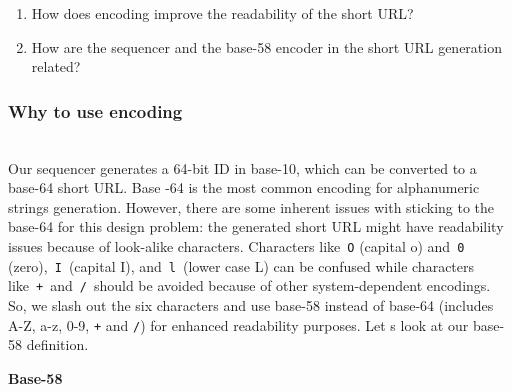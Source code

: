 \begin{enumerate}
\item
\protect{}\label{rLDVaqn8NgodqRd_ozNdy}
How does encoding improve the readability of the short URL?
\item
\protect{}\label{7qYu3UbIk-ill2JuMAZ_V}
How are the sequencer and the base-58 encoder in the short URL generation related?
\end{enumerate}

\subsubsection{Why to use encoding}\label{mgWiNHUUh24oxXd4R2PW_}
\\
Our sequencer generates a 64-bit ID in base-10, which can be converted to a base-64 short URL. Base -64 is the most common encoding for alphanumeric strings\textquotesingle{} generation. However, there are some inherent issues with sticking to the base-64 for this design problem: the generated short URL might have readability issues because of look-alike characters. Characters like~\texttt{O} (capital o) and~\texttt{0} (zero),~\texttt{I}~(capital I), and~\texttt{l}~(lower case L) can be confused while characters like~\texttt{+}~and~\texttt{/}~should be avoided because of other system-dependent encodings.
\\
So, we slash out the six characters and use base-58 instead of base-64 (includes A-Z, a-z, 0-9, \texttt{+} and \texttt{/}) for enhanced readability purposes. Let
\textquotesingle s look at our base-58 definition.

\textbf{Base-58}

